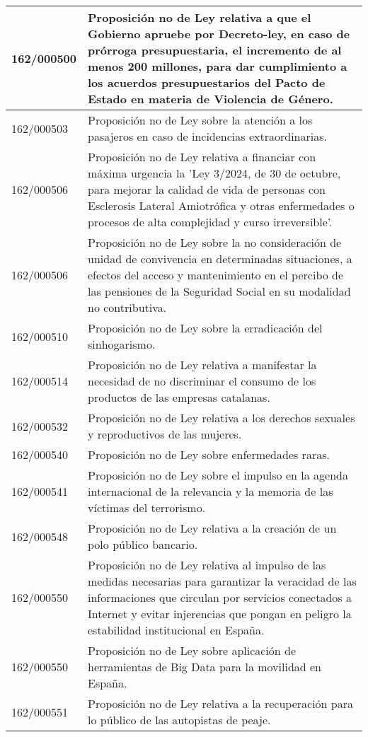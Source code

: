 {\begin{table}[H]
\begin{center}
\begin{tabularx}{\linewidth}{| l | X |}
\hline
162/000500 & Proposición no de Ley relativa a que el Gobierno apruebe por Decreto-ley, en caso de prórroga presupuestaria, el incremento de al menos 200 millones, para dar cumplimiento a los acuerdos presupuestarios del Pacto de Estado en materia de Violencia de Género. \\
\hline
162/000503 & Proposición no de Ley sobre la atención a los pasajeros en caso de incidencias extraordinarias. \\
\hline
162/000506 & Proposición no de Ley relativa a financiar con máxima urgencia la 'Ley 3/2024, de 30 de octubre, para mejorar la calidad de vida de personas con Esclerosis Lateral Amiotrófica y otras enfermedades o procesos de alta complejidad y curso irreversible'. \\
\hline
162/000506 & Proposición no de Ley sobre la no consideración de unidad de convivencia en determinadas situaciones, a efectos del acceso y mantenimiento en el percibo de las pensiones de la Seguridad Social en su modalidad no contributiva. \\
\hline
162/000510 & Proposición no de Ley sobre la erradicación del sinhogarismo. \\
\hline
162/000514 & Proposición no de Ley relativa a manifestar la necesidad de no discriminar el consumo de los productos de las empresas catalanas. \\
\hline
162/000532 & Proposición no de Ley relativa a los derechos sexuales y reproductivos de las mujeres. \\
\hline
162/000540 & Proposición no de Ley sobre enfermedades raras. \\
\hline
162/000541 & Proposición no de Ley sobre el impulso en la agenda internacional de la relevancia y la memoria de las víctimas del terrorismo. \\
\hline
162/000548 & Proposición no de Ley relativa a la creación de un polo público bancario. \\
\hline
162/000550 & Proposición no de Ley relativa al impulso de las medidas necesarias para garantizar la veracidad de las informaciones que circulan por servicios conectados a Internet y evitar injerencias que pongan en peligro la estabilidad institucional en España. \\
\hline
162/000550 & Proposición no de Ley sobre aplicación de herramientas de Big Data para la movilidad en España. \\
\hline
162/000551 & Proposición no de Ley relativa a la recuperación para lo público de las autopistas de peaje. \\

\end{tabularx}
\end{center}
\end{table}}
